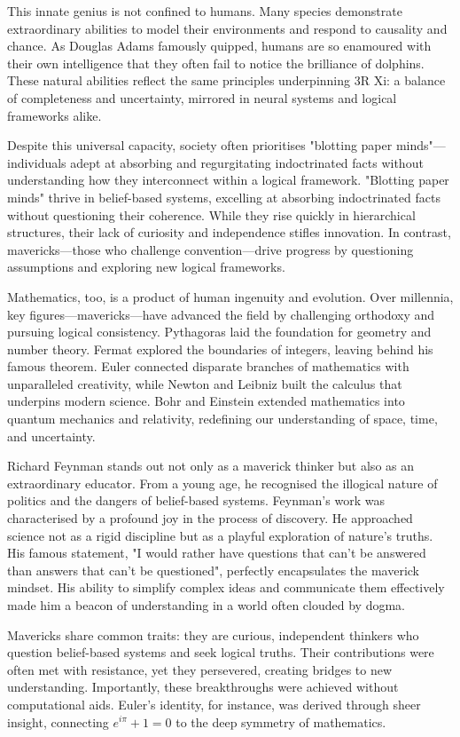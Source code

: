 \documentclass[12pt]{article}
\begin{document}
This innate genius is not confined to humans. Many species demonstrate extraordinary abilities to model their environments and respond to causality and chance. As Douglas Adams famously quipped, humans are so enamoured with their own intelligence that they often fail to notice the brilliance of dolphins. These natural abilities reflect the same principles underpinning 3R Xi: a balance of completeness and uncertainty, mirrored in neural systems and logical frameworks alike.

Despite this universal capacity, society often prioritises "blotting paper minds"—individuals adept at absorbing and regurgitating indoctrinated facts without understanding how they interconnect within a logical framework. "Blotting paper minds" thrive in belief-based systems, excelling at absorbing indoctrinated facts without questioning their coherence. While they rise quickly in hierarchical structures, their lack of curiosity and independence stifles innovation. In contrast, mavericks—those who challenge convention—drive progress by questioning assumptions and exploring new logical frameworks.

Mathematics, too, is a product of human ingenuity and evolution. Over millennia, key figures—mavericks—have advanced the field by challenging orthodoxy and pursuing logical consistency. Pythagoras laid the foundation for geometry and number theory. Fermat explored the boundaries of integers, leaving behind his famous theorem. Euler connected disparate branches of mathematics with unparalleled creativity, while Newton and Leibniz built the calculus that underpins modern science. Bohr and Einstein extended mathematics into quantum mechanics and relativity, redefining our understanding of space, time, and uncertainty.

Richard Feynman stands out not only as a maverick thinker but also as an extraordinary educator. From a young age, he recognised the illogical nature of politics and the dangers of belief-based systems. Feynman’s work was characterised by a profound joy in the process of discovery. He approached science not as a rigid discipline but as a playful exploration of nature’s truths. His famous statement, "I would rather have questions that can’t be answered than answers that can’t be questioned", perfectly encapsulates the maverick mindset. His ability to simplify complex ideas and communicate them effectively made him a beacon of understanding in a world often clouded by dogma.

Mavericks share common traits: they are curious, independent thinkers who question belief-based systems and seek logical truths. Their contributions were often met with resistance, yet they persevered, creating bridges to new understanding. Importantly, these breakthroughs were achieved without computational aids. Euler’s identity, for instance, was derived through sheer insight, connecting \(e^{i\pi} + 1 = 0\) to the deep symmetry of mathematics.
\end{document}
